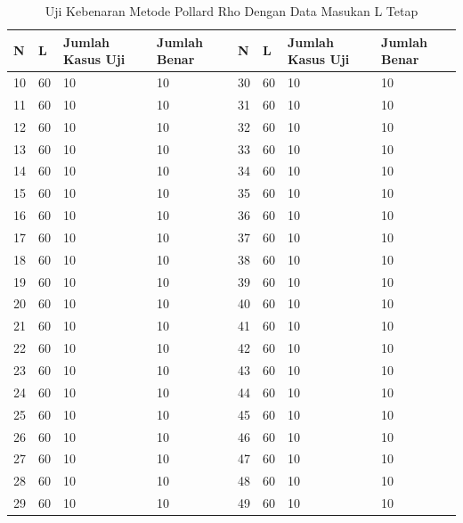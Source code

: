 \begin{table}[h!]
\caption{Uji Kebenaran Metode Pollard Rho Dengan Data Masukan L Tetap}
\label{tab:test_result_fixed_l}
\begin{tabularx} {\linewidth}{ |l l X X|l l X X| }
\hline
N	&L	&Jumlah Kasus Uji	&Jumlah Benar	&N	&L	&Jumlah Kasus Uji	&Jumlah Benar \\
\hline
10	&60	&10					&10				&30	&60	&10					&10 \\
11	&60	&10					&10				&31	&60	&10					&10 \\
12	&60	&10					&10				&32	&60	&10					&10 \\
13	&60	&10					&10				&33	&60	&10					&10 \\
14	&60	&10					&10				&34	&60	&10					&10 \\
15	&60	&10					&10				&35	&60	&10					&10 \\
16	&60	&10					&10				&36	&60	&10					&10 \\
17	&60	&10					&10				&37	&60	&10					&10 \\
18	&60	&10					&10				&38	&60	&10					&10 \\
19	&60	&10					&10				&39	&60	&10					&10 \\
20	&60	&10					&10				&40	&60	&10					&10 \\
21	&60	&10					&10				&41	&60	&10					&10 \\
22	&60	&10					&10				&42	&60	&10					&10 \\
23	&60	&10					&10				&43	&60	&10					&10 \\
24	&60	&10					&10				&44	&60	&10					&10 \\
25	&60	&10					&10				&45	&60	&10					&10 \\
26	&60	&10					&10				&46	&60	&10					&10 \\
27	&60	&10					&10				&47	&60	&10					&10 \\
28	&60	&10					&10				&48	&60	&10					&10 \\
29	&60	&10					&10				&49	&60	&10					&10 \\
\hline
\end{tabularx}
\end{table}
\pagebreak

